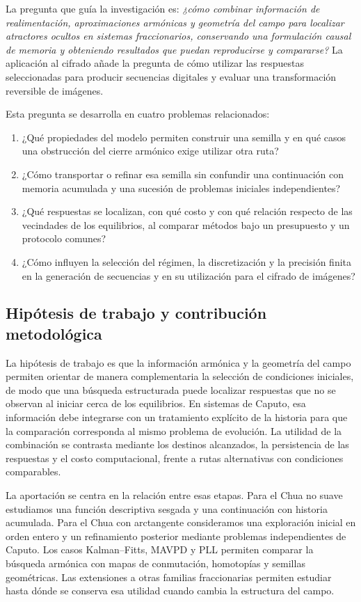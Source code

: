 La pregunta que guía la investigación es: \emph{¿cómo combinar información
de realimentación, aproximaciones armónicas y geometría del campo para
localizar atractores ocultos en sistemas fraccionarios, conservando una
formulación causal de memoria y obteniendo resultados que puedan
reproducirse y compararse?} La aplicación al cifrado añade la pregunta de
cómo utilizar las respuestas seleccionadas para producir secuencias
digitales y evaluar una transformación reversible de imágenes.

Esta pregunta se desarrolla en cuatro problemas relacionados:
\begin{enumerate}
\item ¿Qué propiedades del modelo permiten construir una semilla y en qué
      casos una obstrucción del cierre armónico exige utilizar otra ruta?
\item ¿Cómo transportar o refinar esa semilla sin confundir una
      continuación con memoria acumulada y una sucesión de problemas
      iniciales independientes?
\item ¿Qué respuestas se localizan, con qué costo y con qué relación
      respecto de las vecindades de los equilibrios, al comparar métodos
      bajo un presupuesto y un protocolo comunes?
\item ¿Cómo influyen la selección del régimen, la discretización y la
      precisión finita en la generación de secuencias y en su utilización
      para el cifrado de imágenes?
\end{enumerate}

\subsection{Hipótesis de trabajo y contribución metodológica}
\label{sec:cap1-hipotesis}

La hipótesis de trabajo es que la información armónica y la geometría del
campo permiten orientar de manera complementaria la selección de
condiciones iniciales, de modo que una búsqueda estructurada puede
localizar respuestas que no se observan al iniciar cerca de los equilibrios.
En sistemas de Caputo, esa información debe integrarse con un tratamiento
explícito de la historia para que la comparación corresponda al mismo
problema de evolución. La utilidad de la combinación se contrasta mediante
los destinos alcanzados, la persistencia de las respuestas y el costo
computacional, frente a rutas alternativas con condiciones comparables.

La aportación se centra en la relación entre esas etapas. Para el Chua
no suave estudiamos una función descriptiva sesgada y una continuación
con historia acumulada. Para el Chua con arctangente consideramos una
exploración inicial en orden entero y un refinamiento posterior mediante
problemas independientes de Caputo. Los casos Kalman--Fitts, MAVPD y PLL
permiten comparar la búsqueda armónica con mapas de conmutación,
homotopías y semillas geométricas. Las extensiones a otras familias
fraccionarias permiten estudiar hasta dónde se conserva esa utilidad
cuando cambia la estructura del campo.

